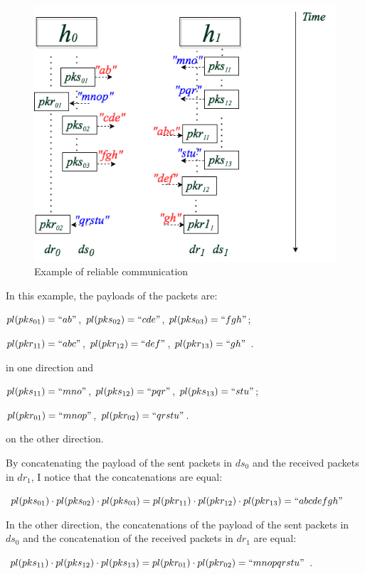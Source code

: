 \documentclass[12pt,oneside]{book}
\begin{document}
\begin{figure}[H]
\centerline{\includegraphics[scale=0.5]{Figures/reliableexample}}
\caption{Example of reliable communication}
\label{reliableexample}
\end{figure}

In this example, the payloads of the packets are:

$pl(pks_{01})=``ab"$, $ pl(pks_{02})=``cde"$, $pl(pks_{03})=``fgh"$;

$pl(pkr_{11})=``abc"$, $pl(pkr_{12})=``def"$, $pl(pkr_{13})=``gh"$ .

in one direction and 

$pl(pks_{11})=``mno"$, $pl(pks_{12})=``pqr"$, $pl(pks_{13})=``stu"$;

$pl(pkr_{01})=``mnop"$, $pl(pkr_{02})=``qrstu"$. 

on the other direction. 

By concatenating the payload of the sent packets in $ds_0$ and the received packets in $dr_1$, I notice that the concatenations are equal: 

$pl(pks_{01}) \cdot pl(pks_{02}) \cdot pl(pks_{03}) = pl(pkr_{11}) \cdot pl(pkr_{12}) \cdot pl(pkr_{13}) = ``abcdefgh"$ 

In the other direction, the concatenations of the payload of the sent packets in $ds_0$ and the concatenation of the received packets in $dr_1$ are equal:

$pl(pks_{11}) \cdot pl(pks_{12}) \cdot pl(pks_{13}) = pl(pkr_{01}) \cdot pl(pkr_{02}) = ``mnopqrstu"$. 
\end{document}
